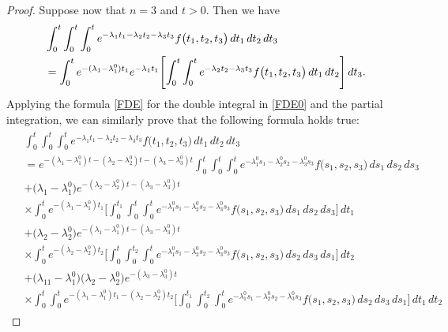 \documentclass[10pt,a4paper]{amsart}
\begin{document}
\begin{proof}
Suppose now that $n=3 $ and $t>0.$ Then we have
\begin{align}
& \notag \int^{t}_{0}\int^{t}_{0}\int^{t}_{0}e^{-\lambda_{1}t_{1}-\lambda_{2}t_{2}-\lambda_{3}t_{3}}f\bigl( t_{1},t_{2},t_{3}\bigr)\, dt_{1}\, dt_{2}\, dt_{3}
\\\label{FDE0}& =\int^{t}_{0}e^{-(\lambda_{1}-\lambda_{1}^{0})t_{1}}e^{-\lambda_{1}t_{1}}\Biggl[ \int^{t}_{0}\int^{t}_{0}e^{-\lambda_{2}t_{2}-\lambda_{3}t_{3}}f\bigl( t_{1},t_{2},t_{3}\bigr)\, dt_{1}\, dt_{2} \Biggr]\, dt_{3}.
\end{align}
Applying the formula \eqref{FDE} for the double integral in \eqref{FDE0} and the partial integration, we can similarly prove that the following formula holds true: {\small
\begin{align}\label{FDE1}
\begin{split}
& \int^{t}_{0}\int^{t}_{0}\int^{t}_{0}e^{-\lambda_{1}t_{1}-\lambda_{2}t_{2}-\lambda_{3}t_{3}}f\bigl( t_{1},t_{2},t_{3}\bigr)\, dt_{1}\, dt_{2}\, dt_{3}
\\& =e^{-(\lambda_{1}-\lambda_{1}^{0})t-(\lambda_{2}-\lambda_{2}^{0})t-(\lambda_{3}-\lambda_{3}^{0})t}\int^{t}_{0}\int^{t}_{0}\int^{t}_{0}e^{-\lambda_{1}^{0}s_{1}-\lambda_{2}^{0}s_{2}-\lambda_{3}^{0}s_{3}}f\bigl( s_{1},s_{2},s_{3}\bigr)\, ds_{1}\, ds_{2} \, ds_{3}
\\& +\bigl( \lambda_{1}-\lambda_{1}^{0}\bigr)e^{-(\lambda_{2}-\lambda_{2}^{0})t-(\lambda_{3}-\lambda_{3}^{0})t}
\\& \times \int^{t}_{0}e^{-(\lambda_{1}-\lambda_{1}^{0})t_{1}}\Biggl[\int^{t_{1}}_{0}\int^{t}_{0}\int^{t}_{0}e^{-\lambda_{1}^{0}s_{1}-\lambda_{2}^{0}s_{2}-\lambda_{3}^{0}s_{3}}f\bigl( s_{1},s_{2},s_{3}\bigr)\, ds_{1}\, ds_{2} \, ds_{3} \Biggr]\, dt_{1}
\\& +\bigl( \lambda_{2}-\lambda_{2}^{0}\bigr)e^{-(\lambda_{1}-\lambda_{1}^{0})t-(\lambda_{3}-\lambda_{3}^{0})t}
\\& \times \int^{t}_{0}e^{-(\lambda_{2}-\lambda_{2}^{0})t_{2}}\Biggl[ \int^{t}_{0}\int^{t_{2}}_{0}\int^{t}_{0}e^{-\lambda_{1}^{0}s_{1}-\lambda_{2}^{0}s_{2}-\lambda_{3}^{0}s_{3}}f\bigl( s_{1},s_{2},s_{3}\bigr)\, ds_{2} \, ds_{3}\, ds_{1} \Biggr]\, dt_{2}
\\& +\bigl( \lambda_{11}-\lambda_{1}^{0}\bigr)\bigl( \lambda_{2}-\lambda_{2}^{0}\bigr)e^{-(\lambda_{3}-\lambda_{3}^{0})t}
\\& \times \int^{t}_{0} \int^{t}_{0}e^{-(\lambda_{1}-\lambda_{1}^{0})t_{1}-(\lambda_{2}-\lambda_{2}^{0})t_{2}}\Biggl[ \int^{t_{1}}_{0}\int^{t_{2}}_{0}\int^{t}_{0}e^{-\lambda_{1}^{0}s_{1}-\lambda_{2}^{0}s_{2}-\lambda_{3}^{0}s_{3}}f\bigl( s_{1},s_{2},s_{3}\bigr)\, ds_{2} \, ds_{3}\, ds_{1} \Biggr]\, dt_{1}\, dt_{2}

\end{split}
\end{align}}
\end{proof}
\end{document}
